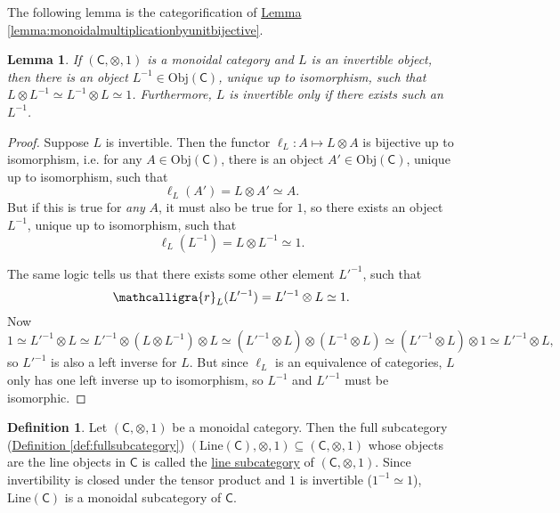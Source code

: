 \documentclass[a4paper]{report}
\newcommand{\sr}{\ensuremath{\mathcalligra{r}}}
\newcommand{\defn}[1]{\ul{#1}}
\newcommand{\Obj}{\mathrm{Obj}}
\newcommand{\Line}{\mathrm{Line}}
\theoremstyle{definition}
\newtheorem{definition}{Definition}[section]
\theoremstyle{plain}
\newtheorem{lemma}{Lemma}[section]
\theoremstyle{remark}
\begin{document}
The following lemma is the categorification of \hyperref[lemma:monoidalmultiplicationbyunitbijective]{Lemma \ref*{lemma:monoidalmultiplicationbyunitbijective}}.
\begin{lemma}
  If $(\mathsf{C}, \otimes, 1)$ is a monoidal category and $L$ is an invertible object, then there is an object $L^{-1} \in \Obj(\mathsf{C})$, unique up to isomorphism, such that $L \otimes L^{-1} \simeq L^{-1} \otimes L \simeq 1$. Furthermore, $L$ is invertible only if there exists such an $L^{-1}$.
\end{lemma}
\begin{proof}
  Suppose $L$ is invertible. Then the functor $\ell_{L}\colon A \mapsto L \otimes A$ is bijective up to isomorphism, i.e. for any $A \in \Obj(\mathsf{C})$, there is an object $A' \in \Obj(\mathsf{C})$, unique up to isomorphism, such that
  \begin{equation*}
    \ell_{L}(A') = L \otimes A' \simeq A.
  \end{equation*}
  But if this is true for \emph{any} $A$, it must also be true for $1$, so there exists an object $L^{-1}$, unique up to isomorphism, such that
  \begin{equation*}
    \ell_{L}(L^{-1}) = L \otimes L^{-1} \simeq 1.
  \end{equation*}

  The same logic tells us that there exists some other element $L'^{-1}$, such that 
  \begin{equation*}
    \sr_{L}(L'^{-1}) = L'^{-1} \otimes L \simeq 1.
  \end{equation*}
  Now 
  \begin{equation*}
    1 \simeq L'^{-1} \otimes L \simeq L'^{-1} \otimes (L \otimes L^{-1}) \otimes L \simeq (L'^{-1} \otimes L) \otimes (L^{-1} \otimes L) \simeq (L'^{-1} \otimes L) \otimes 1 \simeq L'^{-1} \otimes L,
  \end{equation*}
  so $L'^{-1}$ is also a left inverse for $L$. But since $\ell_{L}$ is an equivalence of categories, $L$ only has one left inverse up to isomorphism, so $L^{-1}$ and $L'^{-1}$ must be isomorphic.
\end{proof}

\begin{definition}
  Let $(\mathsf{C}, \otimes, 1)$ be a monoidal category. Then the full subcategory (\hyperref[def:fullsubcategory]{Definition \ref*{def:fullsubcategory}}) $(\Line(\mathsf{C}), \otimes, 1) \subseteq (\mathsf{C}, \otimes, 1)$ whose objects are the line objects in $\mathsf{C}$ is called the \defn{line subcategory} of $(\mathsf{C}, \otimes, 1)$. Since invertibility is closed under the tensor product and $1$ is invertible ($1^{-1} \simeq 1$), $\mathrm{Line}(\mathsf{C})$ is a monoidal subcategory of $\mathsf{C}$.
\end{definition}
\end{document}

